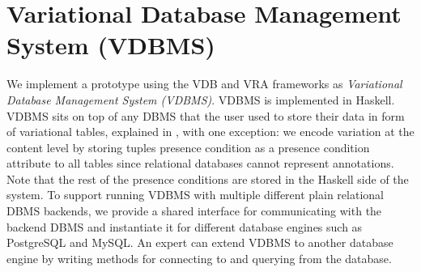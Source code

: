 \chapter{Variational Database Management System (VDBMS)}
\label{ch:vdbms}

%
We implement a prototype using the VDB and VRA frameworks as
\emph{Variational Database Management System (VDBMS)}.
VDBMS is implemented in Haskell. VDBMS sits on 
top of any DBMS that the user used to store their data 
in form of variational tables, explained in , with one exception:
we encode variation at the content level by storing tuples presence condition 
as a presence condition attribute to all tables
since relational databases cannot represent annotations. 
Note that the rest of the presence conditions are stored in the Haskell side of the system.
To support running VDBMS with multiple different plain relational DBMS backends,
we provide
a shared interface
for communicating with the backend DBMS and
instantiate it for different database engines such as PostgreSQL and
MySQL. 
An expert can extend VDBMS to another database engine by
writing methods for connecting to and querying from the database.

%

%




